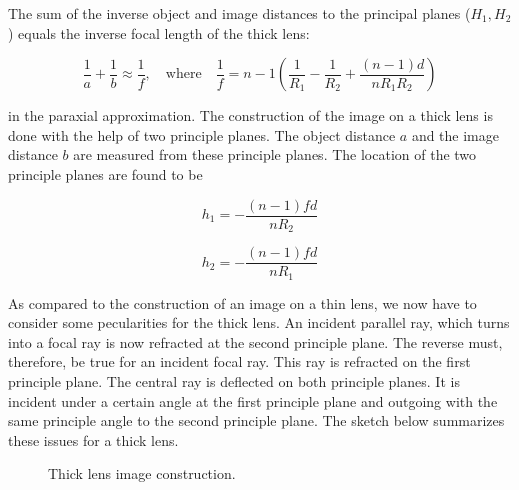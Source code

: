 \documentclass[
  a4paper,
]{book}
\begin{document}
\begin{tcolorbox}[enhanced jigsaw, coltitle=black, title=\textcolor{quarto-callout-note-color}{\faInfo}\hspace{0.5em}{Imaging Equation for Thick Lens}, colframe=quarto-callout-note-color-frame, toprule=.15mm, opacitybacktitle=0.6, left=2mm, opacityback=0, breakable, toptitle=1mm, bottomtitle=1mm, leftrule=.75mm, arc=.35mm, titlerule=0mm, colbacktitle=quarto-callout-note-color!10!white, rightrule=.15mm, bottomrule=.15mm, colback=white]

The sum of the inverse object and image distances to the principal
planes (\(H_1,H_2\)) equals the inverse focal length of the thick lens:

\[\frac{1}{a}+\frac{1}{b}\approx\frac{1}{f}, \quad \text{where} \quad \frac{1}{f}=n-1\left (\frac{1}{R_1}-\frac{1}{R_2}+\frac{(n-1)d}{n R_1 R_2}\right )\]

in the paraxial approximation. The construction of the image on a thick
lens is done with the help of two principle planes. The object distance
\(a\) and the image distance \(b\) are measured from these principle
planes. The location of the two principle planes are found to be

\[h_{1}=-\frac{(n-1)f d}{n R_2}\]

\[h_{2}=-\frac{(n-1)f d}{n R_1}\]

\end{tcolorbox}

As compared to the construction of an image on a thin lens, we now have
to consider some pecularities for the thick lens. An incident parallel
ray, which turns into a focal ray is now refracted at the second
principle plane. The reverse must, therefore, be true for an incident
focal ray. This ray is refracted on the first principle plane. The
central ray is deflected on both principle planes. It is incident under
a certain angle at the first principle plane and outgoing with the same
principle angle to the second principle plane. The sketch below
summarizes these issues for a thick lens.

\begin{figure}


\caption{\label{fig-thick-lens}Thick lens image construction.}

\end{figure}%
\end{document}

